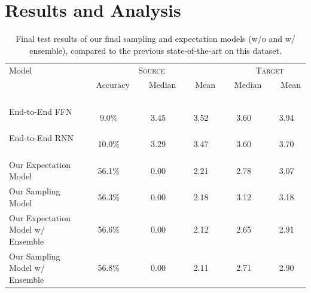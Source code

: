 \documentclass[letterpaper]{article} %
\begin{document}
\section{Results and Analysis}



\begin{table}[ht!]
\begin{center}
\begin{tabular}{|l|ccc|cc|}
\hline
    \multirow{1}{*}{Model} & \multicolumn{3}{c|}{\textsc{Source}} & \multicolumn{2}{c|}{\textsc{ \ \ \ Target}} \\
  &  \ \ Accuracy \ \  & \ \  Median \ \  &  \ \ Mean  \ \  & \ \  Median \ \  &  \ \ Mean \ \  \\
\hline
\hline
End-to-End FFN ~\cite{bisk2016natural} 
& 9.0\% & 3.45 & 3.52 & 3.60 & 3.94 
\\
End-to-End RNN ~\cite{bisk2016natural} \ \ \ 			&	10.0\%	&	3.29	&	3.47	&	3.60	&	3.70	\\
 \hline
 \hline
Our Expectation Model \ \ \ 		&	56.1\% &	0.00	&	2.21	&	2.78	&	3.07	\\
Our Sampling Model \ \ \ 		&	56.3\% &	0.00	&	2.18 	&	3.12	&	3.18	\\
\hline
\hline
Our Expectation Model w/ Ensemble \ \ \ 		&	56.6\%	&	0.00	&	2.12	&	2.65	&	2.91	\\
Our Sampling Model w/ Ensemble\ \ \ 		&	56.8\%&	0.00	&	2.11 	&	2.71	&	2.90	\\
\hline
\end{tabular}
\end{center}
\caption{Final test results of our final sampling and expectation models (w/o and w/ ensemble), compared to the previous state-of-the-art on this dataset.}
\label{table:test_result}
\end{table}
\end{document}
